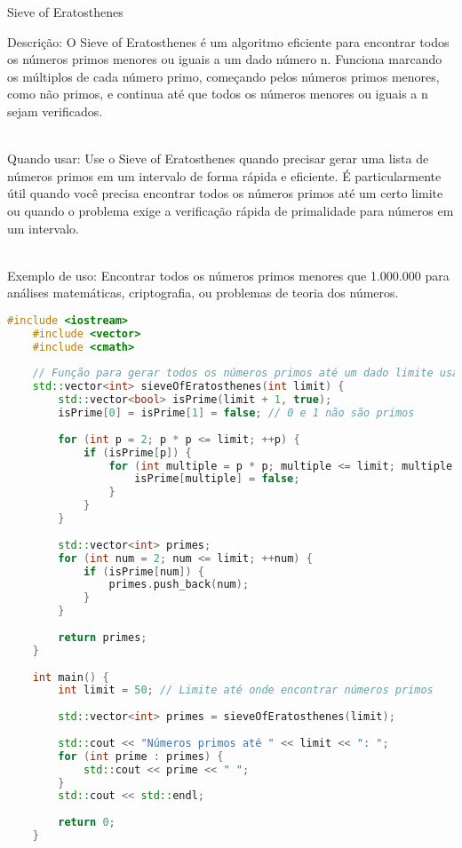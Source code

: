 \documentclass{article}
\begin{document}
Sieve of Eratosthenes

Descrição: O Sieve of Eratosthenes é um algoritmo eficiente para encontrar todos os números primos menores ou iguais a um dado número n. Funciona marcando os múltiplos de cada número primo, começando pelos números primos menores, como não primos, e continua até que todos os números menores ou iguais a n sejam verificados.

\\Quando usar: Use o Sieve of Eratosthenes quando precisar gerar uma lista de números primos em um intervalo de forma rápida e eficiente. É particularmente útil quando você precisa encontrar todos os números primos até um certo limite ou quando o problema exige a verificação rápida de primalidade para números em um intervalo.

\\Exemplo de uso: Encontrar todos os números primos menores que 1.000.000 para análises matemáticas, criptografia, ou problemas de teoria dos números.

\begin{lstlisting}[language=C++, caption=Sieve of Eratosthenes]
    #include <iostream>
    #include <vector>
    #include <cmath>
    
    // Função para gerar todos os números primos até um dado limite usando o Sieve of Eratosthenes
    std::vector<int> sieveOfEratosthenes(int limit) {
        std::vector<bool> isPrime(limit + 1, true);
        isPrime[0] = isPrime[1] = false; // 0 e 1 não são primos
    
        for (int p = 2; p * p <= limit; ++p) {
            if (isPrime[p]) {
                for (int multiple = p * p; multiple <= limit; multiple += p) {
                    isPrime[multiple] = false;
                }
            }
        }
    
        std::vector<int> primes;
        for (int num = 2; num <= limit; ++num) {
            if (isPrime[num]) {
                primes.push_back(num);
            }
        }
    
        return primes;
    }
    
    int main() {
        int limit = 50; // Limite até onde encontrar números primos
    
        std::vector<int> primes = sieveOfEratosthenes(limit);
    
        std::cout << "Números primos até " << limit << ": ";
        for (int prime : primes) {
            std::cout << prime << " ";
        }
        std::cout << std::endl;
    
        return 0;
    }

\end{lstlisting}
\end{document}
